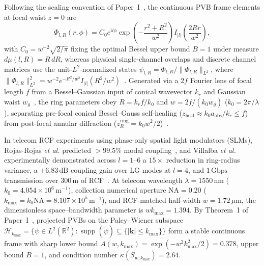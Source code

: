 \documentclass[aps,pra,onecolumn,notitlepage,11pt,tightenlines,nofootinbib,floatfix,longbibliography]{revtex4-2}
\newcommand{\norm}[1]{\lVert #1 \rVert}
\newcommand{\abs}[1]{\lvert #1 \rvert}
\begin{document}
Following the scaling convention of Paper~I~\cite{AyalaPaperI}, the continuous PVB frame elements at focal waist $z = 0$ are
\begin{equation}
\Phi_{l,R}(r,\phi) = C_0 e^{il\phi} \exp\!\left(-\frac{r^2 + R^2}{w^2}\right) I_{\abs{l}}\!\left(\frac{2Rr}{w^2}\right),
\label{eq:pvb_frame_def}
\end{equation}
with $C_0 = w^{-2}\sqrt{2/\pi}$ fixing the optimal Bessel upper bound $B = 1$ under measure $d\mu(l,R) = R\,dR$, whereas physical single-channel overlaps and discrete channel matrices use the unit-$L^2$-normalized states $\psi_{l,R} = \Phi_{l,R}/\norm{\Phi_{l,R}}_{L^2}$, where $\norm{\Phi_{l,R}}_{L^2}^2 = w^{-2} e^{-R^2/w^2} I_{\abs{l}}(R^2/w^2)$~\cite{Gradshteyn2014}. Generated via a $2f$ Fourier lens of focal length $f$ from a Bessel--Gaussian input of conical wavevector $k_r$ and Gaussian waist $w_g$~\cite{Vaity2015,Gori1987}, the ring parameters obey $R = k_r f/k_0$ and $w = 2f/(k_0 w_g)$ ($k_0 = 2\pi/\lambda$), separating pre-focal conical Bessel--Gauss self-healing ($z_{\mathrm{heal}} \approx k_0 a_{\mathrm{obs}}/k_r \le f$) from post-focal annular diffraction ($z_R^{\mathrm{ring}} = k_0 w^2/2$)~\cite{Reddy2016,AyalaPaperI}.

In telecom RCF experiments using phase-only spatial light modulators (SLMs), Rojas-Rojas \emph{et al.} predicted $>99.5\%$ modal coupling~\cite{RojasRojas2021}, and Villalba \emph{et al.} experimentally demonstrated across $l = 1\text{--}6$ a $15\times$ reduction in ring-radius variance, a $+6.83\,\mathrm{dB}$ coupling gain over $\mathrm{LG}$ modes at $l = 4$, and $1\,\mathrm{Gbps}$ transmission over $300\,\mathrm{m}$ of RCF~\cite{Villalba2023}. At telecom wavelength $\lambda = 1550\,\mathrm{nm}$ ($k_0 = 4.054\times 10^6\,\mathrm{m}^{-1}$), collection numerical aperture $\mathrm{NA} = 0.20$ ($k_{\max} = k_0\mathrm{NA} = 8.107\times 10^5\,\mathrm{m}^{-1}$), and RCF-matched half-width $w = 1.72\,\mu\mathrm{m}$, the dimensionless space--bandwidth parameter is $w k_{\max} = 1.394$. By Theorem~1 of Paper~I~\cite{AyalaPaperI}, projected PVBs on the Paley--Wiener subspace $\mathcal{H}_{k_{\max}} = \{\psi \in L^2(\mathbb{R}^2) : \operatorname{supp}(\widetilde{\psi}) \subseteq \{\abs{\mathbf{k}} \le k_{\max}\}\}$ form a stable continuous frame with sharp lower bound $A(w,k_{\max}) = \exp(-w^2 k_{\max}^2/2) = 0.378$, upper bound $B = 1$, and condition number $\kappa(S_{w,k_{\max}}) = 2.64$.
\end{document}
